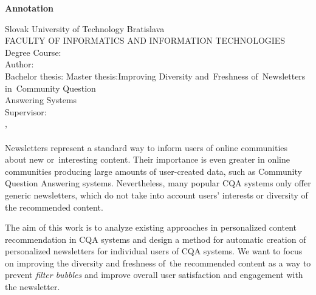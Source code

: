 \afterpage{\blankpage}
\newpage
\thispagestyle{plain}
\begin{center}
\begin{Large}
\textbf{Annotation} \\
\end{Large}
\end{center}
Slovak University of Technology Bratislava
\vspace*{2mm}\\FACULTY OF INFORMATICS AND INFORMATION TECHNOLOGIES
\vspace*{2mm}\\
\noindent
Degree Course:~\ProgramEN
\vspace*{2mm}\\
\noindent
Author:\hspace*{14.5mm}\Author
\vspace*{2mm}\\
{
	{Bachelor thesis: }\TitleEN
}
{
	{Master thesis:\hspace*{4mm}}Improving Diversity and~Freshness of~Newsletters in~Community Question\\
    \hspace*{27.5mm}Answering Systems
}
\vspace*{2mm}\\
Supervisor: \hspace*{7mm}\Supervisor
\vspace*{2mm}\\\Year, \MonthEN\\
\noindent
\\
Newsletters represent a standard way to inform users of online communities about new or~interesting content.
Their importance is even greater in online communities producing large amounts of user-created data, such as
Community Question Answering systems.
Nevertheless, many popular CQA systems only offer generic newsletters, which do not take into account users’ interests
or diversity of the recommended content.

The aim of this work is to analyze existing approaches in personalized content recommendation in CQA systems and design a method for automatic
creation of personalized newsletters for individual users of CQA systems. We want to focus on improving the diversity and freshness of~the
recommended content as a way to prevent \emph{filter bubbles} and improve overall user satisfaction and engagement with the newsletter.

\afterpage{\blankpage}
